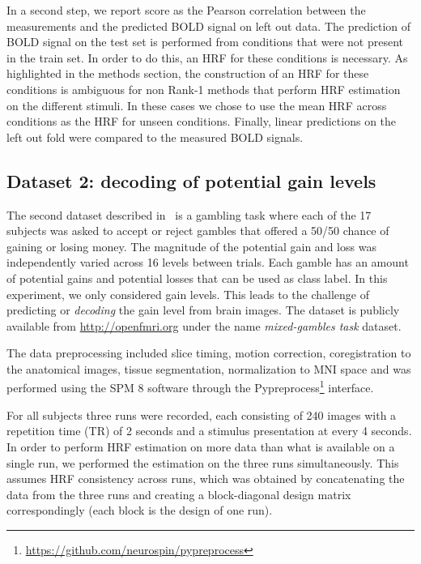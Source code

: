 In a second step, we report score as the Pearson correlation between the measurements and the  predicted BOLD signal on left out data. The prediction of BOLD signal on the test set is performed from conditions that
were not present in the train set. In order to do this, an HRF for these conditions is necessary. As highlighted in the methods section, the
construction of an HRF for these conditions is ambiguous for non Rank-1
methods that perform HRF estimation on the different stimuli. In these cases
we chose to use the mean HRF across conditions as the HRF for unseen
conditions. Finally, linear predictions on the left out fold were compared to
the measured BOLD signals.

\subsection{Dataset 2: decoding of potential gain levels}

The second dataset described in~\citep{Tom2007} is a gambling task where each
of the 17 subjects was asked to accept or reject gambles that offered a 50/50
chance of gaining or losing money. The magnitude of the potential gain and
loss was independently varied across 16 levels between trials. Each gamble has
an amount of potential gains and potential losses that can be used as class label. In
this experiment, we only considered gain levels. This leads to the challenge of
predicting or \emph{decoding} the gain level from brain images. The dataset
is publicly available from \mbox{\url{http://openfmri.org}} under the name 
\emph {mixed-gambles task} dataset.

The data preprocessing included slice timing, motion correction, coregistration to the
anatomical images, tissue segmentation, normalization to MNI space and was
performed using the SPM 8 software through the
Pypreprocess\footnote{\url{https://github.com/neurospin/pypreprocess}}
interface.

For all subjects three runs were recorded, each consisting of 240 images with
a repetition time (TR) of 2 seconds and a stimulus presentation at every 4
seconds. In order to perform HRF estimation on more data than what is
available on a single run, we performed the estimation on the three runs
simultaneously. This assumes HRF consistency across runs, which was obtained by
concatenating the data from the three runs and creating a block-diagonal design matrix correspondingly (each block is the design of one run).


